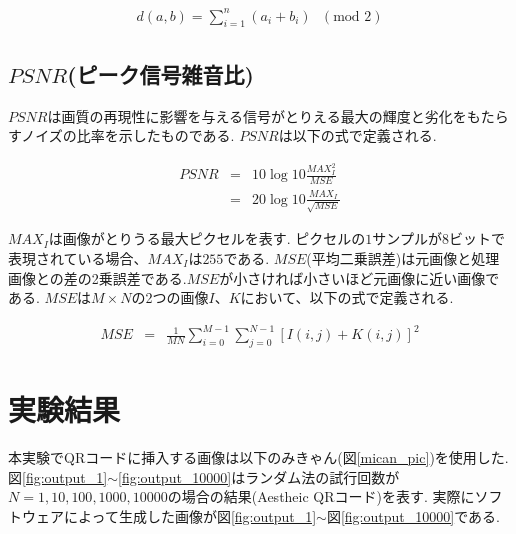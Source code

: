 \documentclass{thesis}
\begin{document}
\begin{eqnarray}
d(a,b)=\sum_{i=1}^{n}(a_{i}+b_{i})\mbox{ }(\mbox{mod } 2)
\end{eqnarray}

\subsection{$PSNR$(ピーク信号雑音比)}

$PSNR$は画質の再現性に影響を与える信号がとりえる最大の輝度と劣化をもたらすノイズの比率を示したものである.
$PSNR$は以下の式で定義される.

\begin{eqnarray}
PSNR&=&10\log{10}\frac{MAX_I^2}{MSE} \\
       &=&20\log{10}\frac{MAX_I}{\sqrt{MSE}}
\end{eqnarray}

$MAX_{I}$は画像がとりうる最大ピクセルを表す.
ピクセルの$1$サンプルが$8$ビットで表現されている場合、$MAX_{I}$は$255$である.
$MSE$(平均二乗誤差)は元画像と処理画像との差の2乗誤差である.$MSE$が小さければ小さいほど元画像に近い画像である.
$MSE$は$M \times N$の2つの画像$I、K$において、以下の式で定義される.

\begin{eqnarray}
MSE&=&\frac{1}{MN}\sum_{i=0}^{M-1}\sum_{j=0}^{N-1}[I(i,j)+K(i,j)]^2
\end{eqnarray}


\section{実験結果}

本実験でQRコードに挿入する画像は以下のみきゃん(図\ref{mican_pic})を使用した.
図\ref{fig:output_1}$\sim$\ref{fig:output_10000}はランダム法の試行回数が$N=1,10,100,1000,10000$の場合の結果(Aestheic QRコード)を表す.
実際にソフトウェアによって生成した画像が図\ref{fig:output_1}$\sim$図\ref{fig:output_10000}である.
\end{document}
